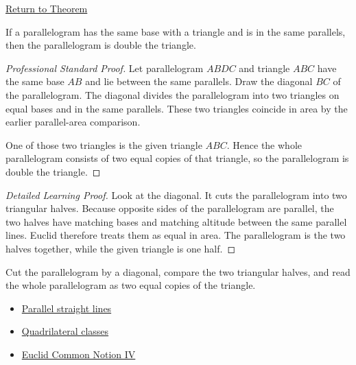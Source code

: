 \newpage
{}
\label{prf:euclid-i-41}

\begin{remark*}[Return]
\hyperref[thm:euclid-i-41]{Return to Theorem}
\end{remark*}

\begin{theorem*}
If a parallelogram has the same base with a triangle and is in the same
parallels, then the parallelogram is double the triangle.
\end{theorem*}



\begin{proof}[Professional Standard Proof]
\LRAProofBodyStart
Let parallelogram $ABDC$ and triangle $ABC$ have the same base $AB$ and lie
between the same parallels. Draw the diagonal $BC$ of the parallelogram. The
diagonal divides the parallelogram into two triangles on equal bases and in
the same parallels. These two triangles coincide in area by the earlier
parallel-area comparison.

One of those two triangles is the given triangle $ABC$. Hence the whole
parallelogram consists of two equal copies of that triangle, so the
parallelogram is double the triangle.
\end{proof}

\begin{proof}[Detailed Learning Proof]
\LRAProofBodyStart
Look at the diagonal. It cuts the parallelogram into two triangular halves.
Because opposite sides of the parallelogram are parallel, the two halves have
matching bases and matching altitude between the same parallel lines. Euclid
therefore treats them as equal in area. The parallelogram is the two halves
together, while the given triangle is one half.
\end{proof}

\begin{remark*}
Cut the parallelogram by a diagonal, compare the two triangular halves, and
read the whole parallelogram as two equal copies of the triangle.
\end{remark*}

\begin{dependencies}
\begin{itemize}
  \item \hyperref[def:euclid-parallel-straight-lines]{Parallel straight lines}
  \item \hyperref[def:euclid-quadrilateral-classes]{Quadrilateral classes}
  \item \hyperref[ax:euclid-common-notion-coinciding-things-equal]{Euclid Common Notion IV}
\end{itemize}
\end{dependencies}

\clearpage
